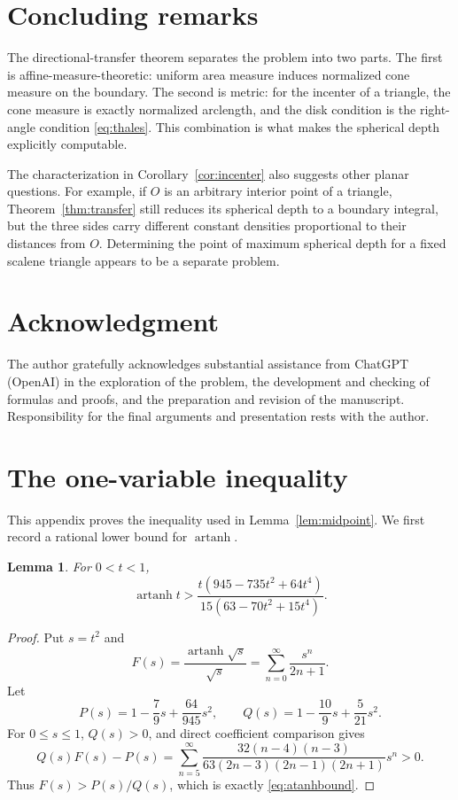 \documentclass[11pt]{article}
\newtheorem{lemma}[theorem]{Lemma}
\theoremstyle{definition}
\theoremstyle{remark}
\newcommand{\artanh}{\operatorname{artanh}}
\begin{document}
\section{Concluding remarks}

The directional-transfer theorem separates the problem into two parts.  The first is affine-measure-theoretic: uniform area measure induces normalized cone measure on the boundary.  The second is metric: for the incenter of a triangle, the cone measure is exactly normalized arclength, and the disk condition is the right-angle condition \eqref{eq:thales}.  This combination is what makes the spherical depth explicitly computable.

The characterization in Corollary~\ref{cor:incenter} also suggests other planar questions.  For example, if $O$ is an arbitrary interior point of a triangle, Theorem~\ref{thm:transfer} still reduces its spherical depth to a boundary integral, but the three sides carry different constant densities proportional to their distances from $O$.  Determining the point of maximum spherical depth for a fixed scalene triangle appears to be a separate problem.

\section*{Acknowledgment}
The author gratefully acknowledges substantial assistance from ChatGPT (OpenAI) in the exploration of the problem, the development and checking of formulas and proofs, and the preparation and revision of the manuscript.  Responsibility for the final arguments and presentation rests with the author.

\appendix
\section{The one-variable inequality}
\label{sec:appendix}

This appendix proves the inequality used in Lemma~\ref{lem:midpoint}.  We first record a rational lower bound for $\artanh$.

\begin{lemma}
\label{lem:atanhbound}
For $0<t<1$,
\begin{equation}
\label{eq:atanhbound}
\artanh t
>
\frac{t(945-735t^2+64t^4)}{15(63-70t^2+15t^4)}.
\end{equation}
\end{lemma}

\begin{proof}
Put $s=t^2$ and
\[
F(s)=\frac{\artanh\sqrt{s}}{\sqrt{s}}
=\sum_{n=0}^{\infty}\frac{s^n}{2n+1}.
\]
Let
\[
P(s)=1-\frac79s+\frac{64}{945}s^2,
\qquad
Q(s)=1-\frac{10}{9}s+\frac5{21}s^2.
\]
For $0\le s\le1$, $Q(s)>0$, and direct coefficient comparison gives
\begin{equation}
\label{eq:PQseries}
Q(s)F(s)-P(s)
=
\sum_{n=5}^{\infty}
\frac{32(n-4)(n-3)}{63(2n-3)(2n-1)(2n+1)}s^n>0.
\end{equation}
Thus $F(s)>P(s)/Q(s)$, which is exactly \eqref{eq:atanhbound}.
\end{proof}
\end{document}
